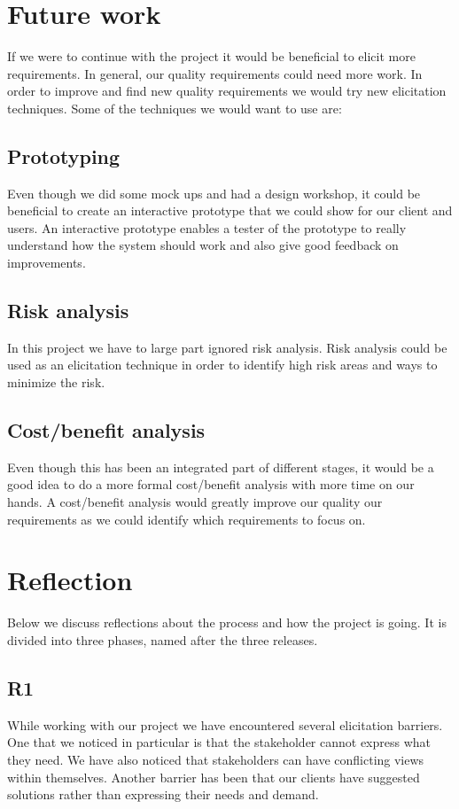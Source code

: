 \documentclass[a4paper]{article}
\begin{document}
	\section{Future work}
If we were to continue with the project it would be beneficial to elicit more requirements. In general, our quality requirements could need more work. In order to improve and find new quality requirements we would try new elicitation techniques. Some of the techniques we would want to use are:
	\subsection*{Prototyping}
	Even though we did some mock ups and had a design workshop, it could be beneficial to create an interactive prototype that we could show for our client and users. An interactive prototype enables a tester of the prototype to really understand how the system should work and also give good feedback on improvements.
	\subsection*{Risk analysis}
	In this project we have to large part ignored risk analysis. Risk analysis could be used as an elicitation technique in order to identify high risk areas and ways to minimize the risk.
	\subsection{Cost/benefit analysis}
	Even though this has been an integrated part of different stages, it would be a good idea to do a more formal cost/benefit analysis with more time on our hands. A cost/benefit analysis would greatly improve our quality our requirements as we could identify which requirements to focus on.

	\section{Reflection}
	Below we discuss reflections about the process and how the project is going. It is divided into three phases, named after the three releases.
	
\subsection{R1}
While working with our project we have encountered several elicitation barriers. One that we noticed in particular is that the stakeholder cannot express what they need. We have also noticed that stakeholders can have conflicting views within themselves. Another barrier has been that our clients have suggested solutions rather than expressing their needs and demand.
\end{document}
